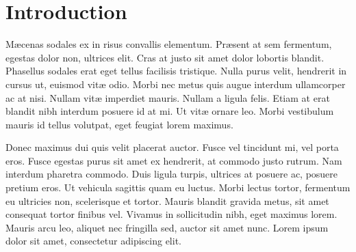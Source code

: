 \documentclass{article}
\begin{document}



\section{Introduction} %

M\ae{}cenas sodales ex in risus convallis elementum. Pr\ae{}sent at sem fermentum, egestas dolor non, ultrices elit. Cras at justo sit amet dolor lobortis blandit. Phasellus sodales erat eget tellus facilisis tristique. Nulla purus velit, hendrerit in cursus ut, euismod vit\ae{} odio. Morbi nec metus quis augue interdum ullamcorper ac at nisi. Nullam vit\ae{} imperdiet mauris. Nullam a ligula felis. Etiam at erat blandit nibh interdum posuere id at mi. Ut vit\ae{} ornare leo. Morbi vestibulum mauris id tellus volutpat, eget feugiat lorem maximus.

Donec maximus dui quis velit placerat auctor. Fusce vel tincidunt mi, vel porta eros. Fusce egestas purus sit amet ex hendrerit, at commodo justo rutrum. Nam interdum pharetra commodo. Duis ligula turpis, ultrices at posuere ac, posuere pretium eros. Ut vehicula sagittis quam eu luctus. Morbi lectus tortor, fermentum eu ultricies non, scelerisque et tortor. Mauris blandit gravida metus, sit amet consequat tortor finibus vel. Vivamus in sollicitudin nibh, eget maximus lorem. Mauris arcu leo, aliquet nec fringilla sed, auctor sit amet nunc. Lorem ipsum dolor sit amet, consectetur adipiscing elit. 
\end{document}
